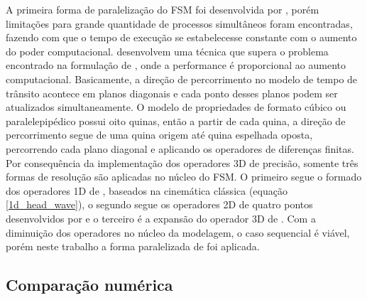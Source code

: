 A primeira forma de paralelização do FSM foi desenvolvida por , porém limitações para grande quantidade de processos simultâneos foram encontradas, fazendo com que o tempo de execução se estabelecesse constante com o aumento do poder computacional.  desenvolvem uma técnica que supera o problema encontrado na formulação de , onde a performance é proporcional ao aumento computacional. Basicamente, a direção de percorrimento no modelo de tempo de trânsito acontece em planos diagonais e cada ponto desses planos podem ser atualizados simultaneamente. O modelo de propriedades de formato cúbico ou paralelepipédico possui oito quinas, então a partir de cada quina, a direção de percorrimento segue de uma quina origem até quina espelhada oposta, percorrendo cada plano diagonal e aplicando os operadores de diferenças finitas. Por consequência da implementação dos operadores 3D de precisão, somente três formas de resolução são aplicadas no núcleo do FSM. O primeiro segue o formado dos operadores 1D de , baseados na cinemática clássica (equação \ref{1d_head_wave}), o segundo segue os operadores 2D de quatro pontos desenvolvidos por  e o terceiro é a expansão do operador 3D de . Com a diminuição dos operadores no núcleo da modelagem, o caso sequencial é viável, porém neste trabalho a forma paralelizada de  foi aplicada.  

\subsection*{Comparação numérica}


